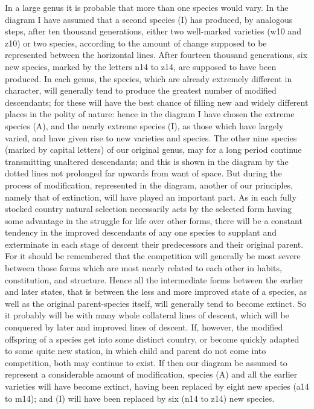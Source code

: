 In a large genus it is probable that more than one species would vary. In the diagram I have assumed that a second species (I) has produced, by analogous steps, after ten thousand generations, either two well-marked varieties (w10 and z10) or two species, according to the amount of change supposed to be represented between the horizontal lines. After fourteen thousand generations, six new species, marked by the letters n14 to z14, are supposed to have been produced. In each genus, the species, which are already extremely different in character, will generally tend to produce the greatest number of modified descendants; for these will have the best chance of filling new and widely different places in the polity of nature: hence in the diagram I have chosen the extreme species (A), and the nearly extreme species (I), as those which have largely varied, and have given rise to new varieties and species. The other nine species (marked by capital letters) of our original genus, may for a long period continue transmitting unaltered descendants; and this is shown in the diagram by the dotted lines not prolonged far upwards from want of space.
But during the process of modification, represented in the diagram, another of our principles, namely that of extinction, will have played an important part. As in each fully stocked country natural selection necessarily acts by the selected form having some advantage in the struggle for life over other forms, there will be a constant tendency in the improved descendants of any one species to supplant and exterminate in each stage of descent their predecessors and their original parent. For it should be remembered that the competition will generally be most severe between those forms which are most nearly related to each other in habits, constitution, and structure. Hence all the intermediate forms between the earlier and later states, that is between the less and more improved state of a species, as well as the original parent-species itself, will generally tend to become extinct. So it probably will be with many whole collateral lines of descent, which will be conquered by later and improved lines of descent. If, however, the modified offspring of a species get into some distinct country, or become quickly adapted to some quite new station, in which child and parent do not come into competition, both may continue to exist.
If then our diagram be assumed to represent a considerable amount of modification, species (A) and all the earlier varieties will have become extinct, having been replaced by eight new species (a14 to m14); and (I) will have been replaced by six (n14 to z14) new species.
